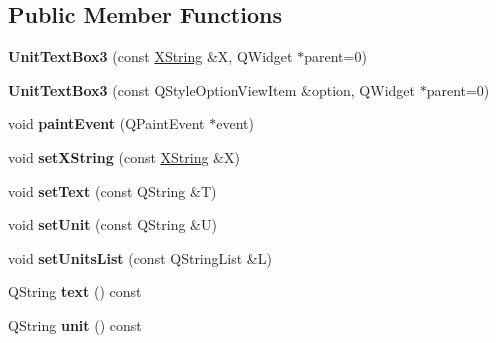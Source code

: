 \subsection*{Public Member Functions}
\begin{DoxyCompactItemize}
\item 
\mbox{\label{class_unit_text_box3_af53d71c2a4b7ac31daebe6e9d0668de1}} 
{\bfseries Unit\+Text\+Box3} (const \hyperlink{class_x_string}{X\+String} \&X, Q\+Widget $\ast$parent=0)
\item 
\mbox{\label{class_unit_text_box3_a32e86ece69cb9178d6a8385bdbd5cd7b}} 
{\bfseries Unit\+Text\+Box3} (const Q\+Style\+Option\+View\+Item \&option, Q\+Widget $\ast$parent=0)
\item 
\mbox{\label{class_unit_text_box3_acef568586389856e64a49b22bf9da649}} 
void {\bfseries paint\+Event} (Q\+Paint\+Event $\ast$event)
\item 
\mbox{\label{class_unit_text_box3_a45edcb2222c980ff6236d0b6ec09c7c2}} 
void {\bfseries set\+X\+String} (const \hyperlink{class_x_string}{X\+String} \&X)
\item 
\mbox{\label{class_unit_text_box3_a5a0fc37239701f3c9c263e300c831b69}} 
void {\bfseries set\+Text} (const Q\+String \&T)
\item 
\mbox{\label{class_unit_text_box3_aba19f42e9e46b2cb79771636d39485ac}} 
void {\bfseries set\+Unit} (const Q\+String \&U)
\item 
\mbox{\label{class_unit_text_box3_a4ade92211bdac2416b2191288c9295ff}} 
void {\bfseries set\+Units\+List} (const Q\+String\+List \&L)
\item 
\mbox{\label{class_unit_text_box3_a72d4457054ccddce5d7f6ccdbdc0c6e4}} 
Q\+String {\bfseries text} () const
\item 
\mbox{\label{class_unit_text_box3_a9ef5bee0b5e85d8897abf7401757f821}} 
Q\+String {\bfseries unit} () const
\item 
\mbox{\label{class_unit_text_box3_a731125157a2bca4168637f5f4a6386c6}} 

\end{DoxyCompactItemize}
